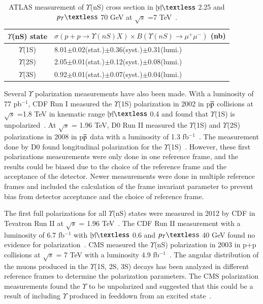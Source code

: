 \begin{table}
  \begin{center}
    \caption[]{ATLAS measurement of $\Upsilon$(nS) cross section in $|y|\textless$ 2.25 and $p_{T}\textless$ 70 GeV
      at $\surd s$ =7 TeV~\cite{ATLAS:2012lmu}.}
\label{Tab:ATLASYCross}
\begin{tabular}{cl} 
\hline 
\hline
$\Upsilon$(nS) state             &$ \sigma(p+p \rightarrow \Upsilon(nS)X) \times B(\Upsilon(nS)\rightarrow\mu^{+}\mu^{-})$ (nb)    \\              
\hline
$\Upsilon$(1S)                   &8.01$\pm$0.02(stat.)$\pm$0.36(syst.)$\pm$0.31(lumi.)\\
$\Upsilon$(2S)                   &2.05$\pm$0.01(stat.)$\pm$0.12(syst.)$\pm$0.08(lumi.)\\
$\Upsilon$(3S)                   &0.92$\pm$0.01(stat.)$\pm$0.07(syst.)$\pm$0.04(lumi.)\\
\hline
\hline
\end{tabular}
\end{center}
\end{table}

Several $\Upsilon$ polarization measurements have also been made. With a luminosity
of 77 pb$^{-1}$, CDF Run I measured the $\Upsilon$(1S) polarization in 2002 in 
p$\overline{\rm p}$ collisions at $\surd s$ =1.8 TeV in knematic range
$|y|\textless$ 0.4 and found that $\Upsilon$(1S) is unpolarized~\cite{CDF:2001fdy}.
At $\surd s$  = 1.96 TeV, D0 Run II measured the $\Upsilon$(1S) and $\Upsilon$(2S) polarizations in
2008 in p$\overline{\rm p}$ data
with a luminosity of 1.3 fb$^{-1}$~\cite{D0:2008yos}. The measurement done by D0 found
longitudinal polarization for the $\Upsilon$(1S)~\cite{D0:2008yos}.
However, these first polarizations
measurements were only done in one reference frame, and the results could be biased due to the choice
of the reference frame and the acceptance of the detector. Newer measurements were done in multiple
reference frames and included the calculation of the frame invariant parameter to
prevent bias from detector acceptance and the choice of reference frame.


The first full polarizations for all $\Upsilon$(nS) states were measured in 2012 by
CDF in Tevatron Run II at $\surd s$  = 1.96 TeV~\cite{CDF:2011ag}.
The CDF Run II measurement with a luminosity of 6.7 fb$^{-1}$
with $|y|\textless$ 0.6 and $p_{T}\textless$ 40 GeV found no evidence for
polarization~\cite{CDF:2011ag}.
CMS measured the $\Upsilon$(nS) polarization in 2003 in p+p collisions
at $\surd s$  = 7 TeV with a luminosity 4.9 fb$^{-1}$~\cite{CMS:2012bpf}.
The angular distribution of the muons produced in the $\Upsilon$(1S, 2S, 3S)
decays has been analyzed in different reference frames to determine the
polarization parameters.
The CMS polarization measurements found the $\Upsilon$
to be unpolarized and suggested that this could be a result of including
$\Upsilon$ produced in feeddown from an excited state~\cite{CMS:2012bpf}.

